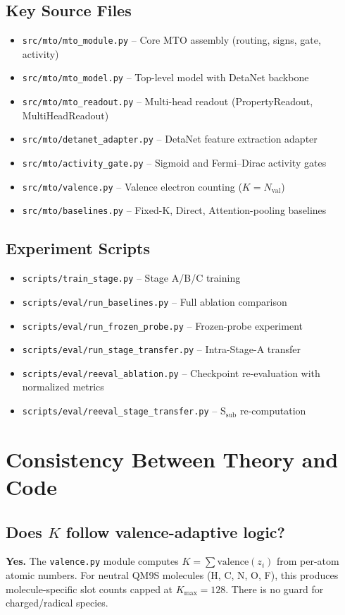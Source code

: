 \documentclass[11pt,a4paper]{article}
\begin{document}
\subsection{Key Source Files}
\begin{itemize}[nosep]
    \item \texttt{src/mto/mto\_module.py} -- Core MTO assembly (routing, signs, gate, activity)
    \item \texttt{src/mto/mto\_model.py} -- Top-level model with DetaNet backbone
    \item \texttt{src/mto/mto\_readout.py} -- Multi-head readout (PropertyReadout, MultiHeadReadout)
    \item \texttt{src/mto/detanet\_adapter.py} -- DetaNet feature extraction adapter
    \item \texttt{src/mto/activity\_gate.py} -- Sigmoid and Fermi--Dirac activity gates
    \item \texttt{src/mto/valence.py} -- Valence electron counting ($K = N_\text{val}$)
    \item \texttt{src/mto/baselines.py} -- Fixed-K, Direct, Attention-pooling baselines
\end{itemize}

\subsection{Experiment Scripts}
\begin{itemize}[nosep]
    \item \texttt{scripts/train\_stage.py} -- Stage A/B/C training
    \item \texttt{scripts/eval/run\_baselines.py} -- Full ablation comparison
    \item \texttt{scripts/eval/run\_frozen\_probe.py} -- Frozen-probe experiment
    \item \texttt{scripts/eval/run\_stage\_transfer.py} -- Intra-Stage-A transfer
    \item \texttt{scripts/eval/reeval\_ablation.py} -- Checkpoint re-evaluation with normalized metrics
    \item \texttt{scripts/eval/reeval\_stage\_transfer.py} -- S$_\text{sub}$ re-computation
\end{itemize}

\section{Consistency Between Theory and Code}

\subsection{Does $K$ follow valence-adaptive logic?}
\textbf{Yes.} The \texttt{valence.py} module computes $K = \sum \text{valence}(z_i)$ from per-atom atomic numbers. For neutral QM9S molecules (H, C, N, O, F), this produces molecule-specific slot counts capped at $K_\text{max} = 128$. There is no guard for charged/radical species.
\end{document}
